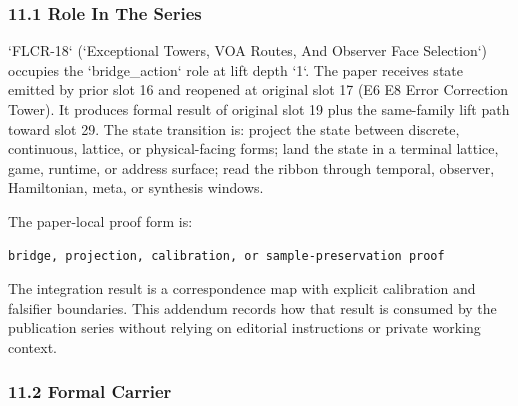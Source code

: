 \documentclass[11pt]{article}
\begin{document}
\subsubsection*{11.1 Role In The Series}

`FLCR-18` (`Exceptional Towers, VOA Routes, And Observer Face Selection`) occupies the `bridge\_action` role at lift depth `1`.
The paper receives state emitted by prior slot 16 and reopened at original slot 17 (E6 E8 Error Correction Tower). It produces formal result of original slot 19 plus the same-family lift path toward slot 29. The state transition is:
project the state between discrete, continuous, lattice, or physical-facing forms; land the state in a terminal lattice, game, runtime, or address surface; read the ribbon through temporal, observer, Hamiltonian, meta, or synthesis windows.

The paper-local proof form is:

\begin{verbatim}
bridge, projection, calibration, or sample-preservation proof
\end{verbatim}

The integration result is a correspondence map with explicit calibration and falsifier boundaries. This addendum records how that result is
consumed by the publication series without relying on editorial instructions or
private working context.

\subsubsection*{11.2 Formal Carrier}
\end{document}
